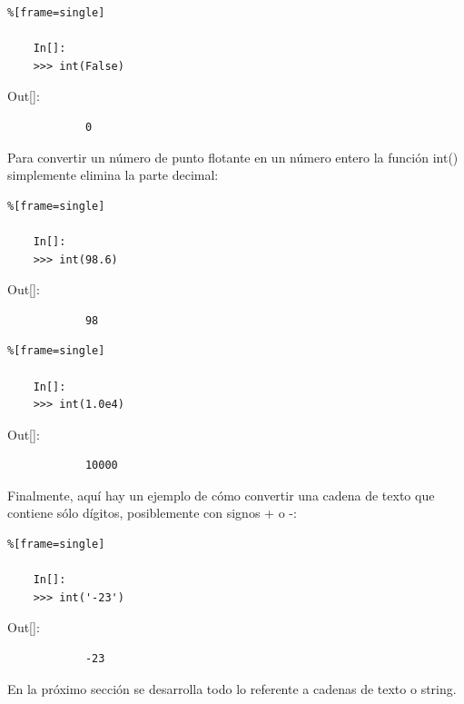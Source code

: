 \begin{lstlisting}%[frame=single]
	
	In[]:
	>>> int(False)	
\end{lstlisting}

{\ttfamily\scriptsize\scriptsize 
	\hspace{-0.65cm}Out[]:\vspace{-0.15cm}	
	{\color{blue} 	
		\begin{verbatim}
			0
		\end{verbatim}
}}

Para convertir un número de punto flotante en un número entero la función {\ttfamily int()}  simplemente elimina la parte  decimal:


\begin{lstlisting}%[frame=single]
	
	In[]:
	>>> int(98.6)	
\end{lstlisting}

{\ttfamily\scriptsize\scriptsize 
	\hspace{-0.65cm}Out[]:\vspace{-0.15cm}	
	{\color{blue} 	
		\begin{verbatim}
			98
		\end{verbatim}
}}		

\begin{lstlisting}%[frame=single]
	
	In[]:
	>>> int(1.0e4)	
\end{lstlisting}

{\ttfamily\scriptsize\scriptsize 
	\hspace{-0.65cm}Out[]:\vspace{-0.15cm}	
	{\color{blue} 	
		\begin{verbatim}
			10000
		\end{verbatim}
}}

Finalmente, aquí hay un ejemplo de cómo convertir una cadena de texto  que contiene sólo dígitos, posiblemente con signos  {\ttfamily +} o {\ttfamily -}:

\begin{lstlisting}%[frame=single]
	
	In[]:	
	>>> int('-23')	
\end{lstlisting}

{\ttfamily\scriptsize\scriptsize 
	\hspace{-0.65cm}Out[]:\vspace{-0.15cm}	
	{\color{blue} 	
		\begin{verbatim}
			-23
		\end{verbatim}
}}
En la próximo sección se desarrolla todo lo referente a cadenas de texto o string.

